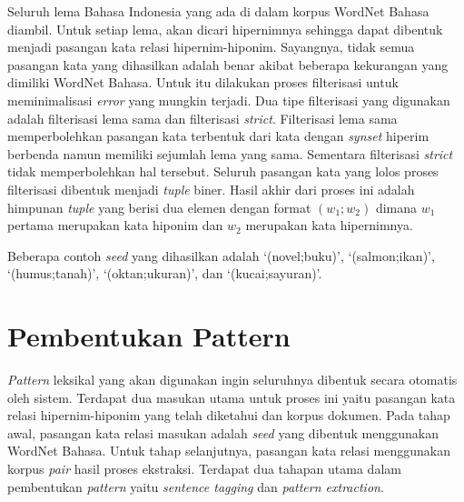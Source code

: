 Seluruh lema Bahasa Indonesia yang ada di dalam korpus WordNet Bahasa diambil. Untuk setiap lema, akan dicari hipernimnya sehingga dapat dibentuk menjadi pasangan kata relasi hipernim-hiponim. Sayangnya, tidak semua pasangan kata yang dihasilkan adalah benar akibat beberapa kekurangan yang dimiliki WordNet Bahasa. Untuk itu dilakukan proses filterisasi untuk meminimalisasi \textit{error} yang mungkin terjadi. Dua tipe filterisasi yang digunakan adalah filterisasi lema sama dan filterisasi \textit{strict}. Filterisasi lema sama memperbolehkan pasangan kata terbentuk dari kata dengan \textit{synset} hiperim berbenda namun memiliki sejumlah lema yang sama. Sementara filterisasi \textit{strict} tidak memperbolehkan hal tersebut. Seluruh pasangan kata yang lolos proses filterisasi dibentuk menjadi \textit{tuple} biner. Hasil akhir dari proses ini adalah himpunan \textit{tuple} yang berisi dua elemen dengan format $(w_1;w_2)$ dimana $w_1$ pertama merupakan kata hiponim dan $w_2$ merupakan kata hipernimnya.

Beberapa contoh \textit{seed} yang dihasilkan adalah `(novel;buku)', `(salmon;ikan)', `(humus;tanah)', `(oktan;ukuran)', dan `(kucai;sayuran)'.


\section{Pembentukan Pattern}
\textit{Pattern} leksikal yang akan digunakan ingin seluruhnya dibentuk secara otomatis oleh sistem. Terdapat dua masukan utama untuk proses ini yaitu pasangan kata relasi hipernim-hiponim yang telah diketahui dan korpus dokumen. Pada tahap awal, pasangan kata relasi masukan adalah \textit{seed} yang dibentuk menggunakan WordNet Bahasa. Untuk tahap selanjutnya, pasangan kata relasi menggunakan korpus \textit{pair} hasil proses ekstraksi. Terdapat dua tahapan utama dalam pembentukan \textit{pattern} yaitu \textit{sentence tagging} dan \textit{pattern extraction}.

